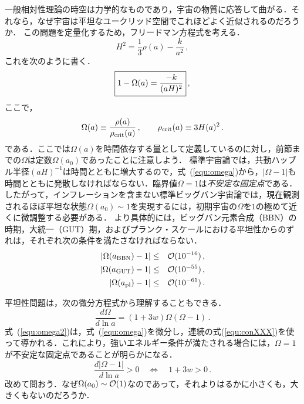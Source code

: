 一般相対性理論の時空は力学的なものであり，宇宙の物質に応答して曲がる．それなら，なぜ宇宙は平坦なユークリッド空間でこれほどよく近似されるのだろうか．
この問題を定量化するため，フリードマン方程式を考える．
\begin{equation}
H^2 = \frac{1}{3} \rho(a) - \frac{k}{a^2}\, ,
\end{equation}
これを次のように書く．
\begin{equation}
\label{equ:omega}
\fbox{$\displaystyle
1-\Omega(a) = \frac{-k}{(aH)^2}$}\, ,
\end{equation}
ここで，
\begin{equation}
\Omega(a) \equiv \frac{\rho(a)}{\rho_{\rm crit}(a)}\, , \qquad \rho_{\rm crit}(a) \equiv 3 H(a)^2\, .
\end{equation}
である．ここでは$\Omega(a)$を時間依存する量として定義しているのに対し，前節までの$\Omega$は定数$\Omega(a_0)$であったことに注意しよう．
標準宇宙論では，共動ハッブル半径$(aH)^{-1}$は時間とともに増大するので，式~(\ref{equ:omega})から，$|\Omega-1|$も時間とともに発散しなければならない．臨界値$\Omega=1$は{\it 不安定な固定点}である．したがって，インフレーションを含まない標準ビッグバン宇宙論では，現在観測されるほぼ平坦な状態$\Omega(a_0) \sim 1$を実現するには，初期宇宙の$\Omega$を$1$の極めて近くに微調整する必要がある．
より具体的には，ビッグバン元素合成（BBN）の時期，大統一（GUT）期，およびプランク・スケールにおける平坦性からのずれは，それぞれ次の条件を満たさなければならない．
\begin{eqnarray}
|\Omega(a_{\rm BBN})-1| &\le& {\cal O}(10^{-16})\, ,\\
|\Omega(a_{\rm GUT})-1| &\le& {\cal O}(10^{-55})\, ,\\
|\Omega(a_{\rm pl})-1| &\le& {\cal O}(10^{-61})\, .
\end{eqnarray}

平坦性問題は，次の微分方程式から理解することもできる．
\begin{equation}
\label{equ:omega2}
\frac{d \Omega}{d \ln a} = (1+3w) \Omega (\Omega-1)\, .
\end{equation}
式~(\ref{equ:omega2})は，式~(\ref{equ:omega})を微分し，連続の式(\ref{equ:conXXX})を使って導かれる．これにより，強いエネルギー条件が満たされる場合には，$\Omega=1$が不安定な固定点であることが明らかになる．
\begin{equation}
\frac{d |\Omega-1|}{d \ln a} > 0 \quad \Leftrightarrow \quad 1+3w > 0\, .
\end{equation}
改めて問おう．なぜ$\Omega(a_0) \sim {\cal O}(1)$なのであって，それよりはるかに小さくも，大きくもないのだろうか．


